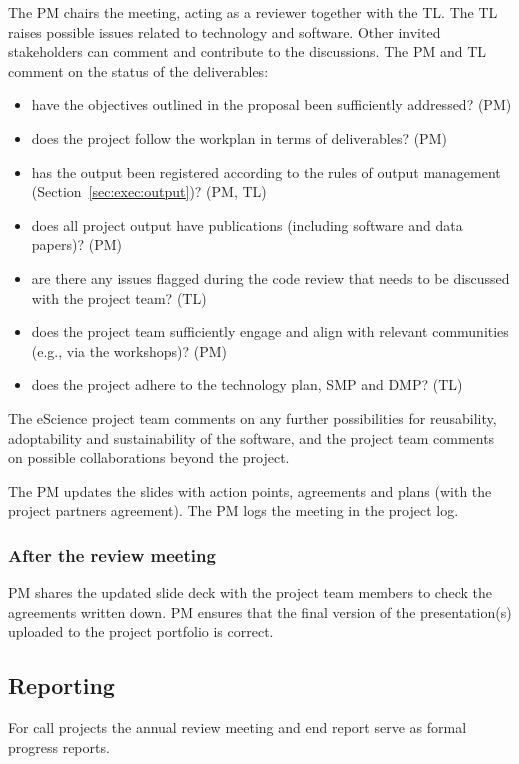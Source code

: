 \documentclass[11pt]{article}
\begin{document}
The PM chairs the meeting, acting as a reviewer together with the TL. The TL raises possible issues related to
technology and software. Other invited stakeholders can comment and contribute to the discussions. The PM and TL
comment on the status of the deliverables:

\begin{itemize}
\item have the objectives outlined in the proposal been sufficiently addressed? (PM)
\item does the project follow the workplan in terms of deliverables? (PM)
\item has the output been registered according to the rules of output management (Section~\ref{sec:exec:output})? (PM, TL)
\item does all project output have publications (including software and data papers)? (PM)
\item are there any issues flagged during the code review that needs to be discussed with the project team? (TL)
\item does the project team sufficiently engage and align with relevant communities (e.g., via the workshops)? (PM)
\item does the project adhere to the technology plan, SMP and DMP? (TL)
\end{itemize}

The eScience project team comments on any further possibilities for reusability, adoptability and sustainability of the
software, and the project team comments on possible collaborations beyond the project.

The PM updates the slides with action points, agreements and plans (with the project partners agreement). The PM logs
the meeting in the project log.

\subsubsection{After the review meeting}
PM shares the updated slide deck with the project team members to check the agreements written down. PM ensures that the
final version of the presentation(s) uploaded to the project portfolio is correct.

\subsection{Reporting}
For call projects the annual review meeting and end report serve as formal progress reports.
\end{document}
